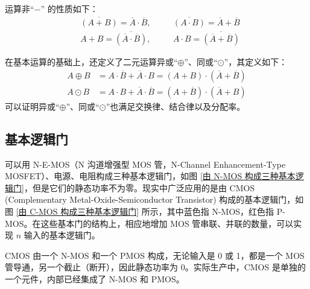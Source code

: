\documentclass[UTF8]{report}
\theoremstyle{MyLineTheoremStyle} %
\theoremstyle{MyBlockTheoremStyle} %
\theoremstyle{MySubsubsectionStyle} %
\begin{document}
运算非“$-$” 的性质如下：
\begin{equation}
\begin{aligned}
    &\overline{(A + B)} = \overline{A} \cdot \overline{B} ,\quad &&\overline{(A \cdot B)} = \overline{A} + \overline{B} \\
    &A + B = \overline{(\overline{A} \cdot \overline{B})},\quad && A \cdot B = \overline{(\overline{A} + \overline{B})}
\end{aligned}
\end{equation}

在基本运算的基础上，还定义了二元运算异或“$\oplus$”、同或“$\odot$”，其定义如下：
\begin{equation}
\begin{aligned}
    A \oplus B &= A \cdot \overline{B} + \overline{A} \cdot B = (A + B) \cdot (\overline{A} + \overline{B})\\
    A \odot B &= A \cdot B  + \overline{A} \cdot \overline{B} = (A + \overline{B}) \cdot (\overline{A} + B)
\end{aligned}
\end{equation}
可以证明异或“$\oplus$”、同或“$\odot$”也满足交换律、结合律以及分配率。

\subsection{基本逻辑门}\label{基本逻辑门}

可以用 N-E-MOS（N 沟道增强型 MOS 管，N-Channel Enhancement-Type MOSFET）、电源、电阻构成三种基本逻辑门，如图 \ref{由 N-MOS 构成三种基本逻辑门}，但是它们的静态功率不为零。现实中广泛应用的是由 CMOS (Complementary Metal-Oxide-Semiconductor Transistor) 构成的基本逻辑门，如图 \ref{由 C-MOS 构成三种基本逻辑门} 所示，其中蓝色指 N-MOS，红色指 P-MOS。在这些基本门的结构上，相应地增加 MOS 管串联、并联的数量，可以实现 $n$ 输入的基本逻辑门。

CMOS 由一个 N-MOS 和一个 PMOS 构成，无论输入是 0 或 1，都是一个 MOS 管导通，另一个截止（断开），因此静态功率为 0。实际生产中，CMOS 是单独的一个元件，内部已经集成了 N-MOS 和 PMOS。

\end{document}

